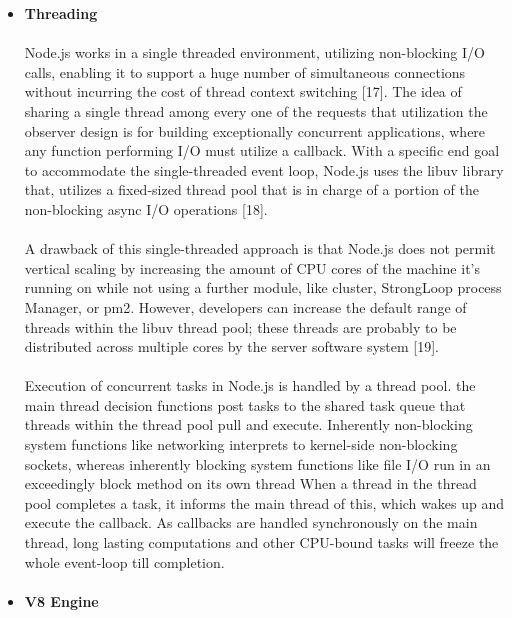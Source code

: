 \documentclass[thesis.tex]{subfiles}
\begin{document}
\begin{itemize}
    \item \textbf{Threading}
    \paragraph{}
    Node.js works in a single threaded environment, utilizing non-blocking I/O calls, enabling it to support a huge number of simultaneous connections without incurring the cost of thread context switching [17]. The idea of sharing a single thread among every one of the requests that utilization the observer design is for building exceptionally concurrent applications, where any function performing I/O must utilize a callback. With a specific end goal to accommodate the single-threaded event loop, Node.js uses the libuv library that, utilizes a fixed-sized thread pool that is in charge of a portion of the non-blocking async I/O operations [18].
    \paragraph{}
    A drawback of this single-threaded approach is that Node.js does not permit vertical scaling by increasing the amount of CPU cores of the machine it's running on while not using a further module, like cluster, StrongLoop process Manager, or pm2. However, developers can increase the default range of threads within the libuv thread pool; these threads are probably to be distributed across multiple cores by the server software system [19].
    \paragraph{}
    Execution of concurrent tasks in Node.js is handled by a thread pool. the main thread decision functions post tasks to the shared task queue that threads within the thread pool pull and execute. Inherently non-blocking system functions like networking interprets to kernel-side non-blocking sockets, whereas inherently blocking system functions like file I/O run in an exceedingly block method on its own thread When a thread in the thread pool completes a task, it informs the main thread of this, which wakes up and execute the callback. As callbacks are handled synchronously on the main thread, long lasting computations and other CPU-bound tasks will freeze the whole event-loop till completion.
    \paragraph{}
    \item \textbf{V8 Engine}

\end{itemize}
\end{document}
